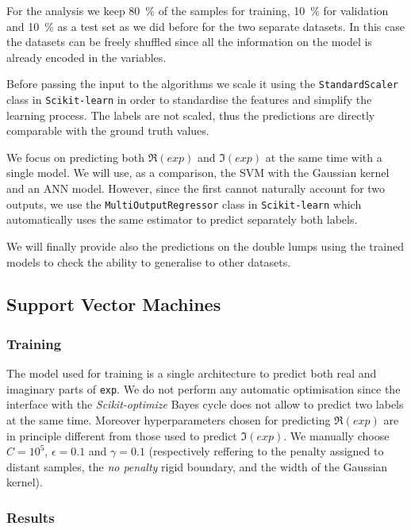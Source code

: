 For the analysis we keep \SI{80}{\percent} of the samples for training, \SI{10}{\percent} for validation and \SI{10}{\percent} as a test set as we did before for the two separate datasets.
In this case the datasets can be freely shuffled since all the information on the model is already encoded in the variables.

Before passing the input to the algorithms we scale it using the \texttt{StandardScaler} class in \texttt{Scikit-learn} in order to standardise the features and simplify the learning process.
The labels are not scaled, thus the predictions are directly comparable with the ground truth values.

We focus on predicting both $\Re(exp)$ and $\Im(exp)$ at the same time with a single model.
We will use, as a comparison, the SVM with the Gaussian kernel and an ANN model.
However, since the first cannot naturally account for two outputs, we use the \texttt{MultiOutputRegressor} class in \texttt{Scikit-learn} which automatically uses the same estimator to predict separately both labels.

We will finally provide also the predictions on the double lumps using the trained models to check the ability to generalise to other datasets.


\subsection{Support Vector Machines}

\subsubsection{Training}

The model used for training is a single architecture to predict both real and imaginary parts of \texttt{exp}.
We do not perform any automatic optimisation since the interface with the \emph{Scikit-optimize} Bayes cycle does not allow to predict two labels at the same time.
Moreover hyperparameters chosen for predicting $\Re(exp)$ are in principle different from those used to predict $\Im(exp)$.
We manually choose $C = 10^5$, $\epsilon= 0.1$ and $\gamma = 0.1$ (respectively reffering to the penalty assigned to distant samples, the \emph{no penalty} rigid boundary, and the width of the Gaussian kernel).


\subsubsection{Results}

